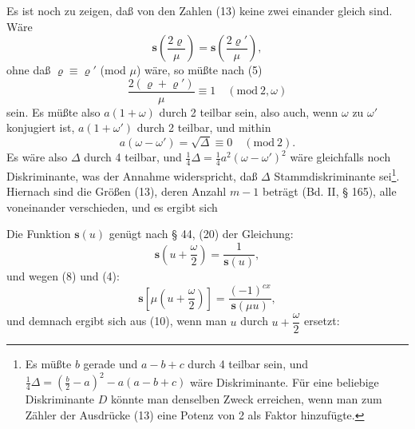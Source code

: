 Es ist noch zu zeigen, daß von den Zahlen (13) keine zwei
einander gleich sind. Wäre
\[
\boldsymbol{s}\left(\frac{2\varrho}{\mu}\right) = \boldsymbol{s}\left(\frac{2\varrho'}{\mu}\right),
\]
ohne daß $\varrho \equiv \varrho'$ (mod $\mu$) wäre, so müßte nach (5)
\[
\frac{2(\varrho + \varrho')}{\mu} \equiv 1 \quad (\mathrm{mod}\ 2, \omega)
\]
sein. Es müßte also $a(1+\omega)$ durch 2 teilbar sein, also auch,
wenn $\omega$ zu $\omega'$ konjugiert ist, $a(1+\omega')$ durch 2 teilbar, und
mithin
\[
a(\omega - \omega') = \sqrt{\Delta} \equiv 0 \quad (\mathrm{mod}\ 2).
\]
Es wäre also $\Delta$ durch 4 teilbar, und $\frac{1}{4}\Delta = \frac{1}{4}a^2(\omega - \omega')^2$
wäre gleichfalls noch Diskriminante, was der Annahme widerspricht,
daß $\Delta$ Stammdiskriminante sei\footnote{Es müßte $b$ gerade und $a-b+c$ durch 4 teilbar sein, und
$\frac{1}{4}\Delta = \left(\frac{b}{2}-a\right)^2 - a(a-b+c)$ wäre Diskriminante. Für eine beliebige
Diskriminante $D$ könnte man denselben Zweck erreichen, wenn man zum
Zähler der Ausdrücke (13) eine Potenz von 2 als Faktor hinzufügte.}. Hiernach sind die
Größen (13), deren Anzahl $m-1$ beträgt (Bd. II, § 165), alle
voneinander verschieden, und es ergibt sich

Die Funktion $\boldsymbol{s}(u)$ genügt nach § 44, (20) der Gleichung:
\[
\boldsymbol{s}\left(u + \frac{\omega}{2}\right) = \frac{1}{\boldsymbol{s}(u)},
\]
und wegen (8) und (4):
\[
\boldsymbol{s}\left[\mu\left(u + \frac{\omega}{2}\right)\right] = \frac{(-1)^{cx}}{\boldsymbol{s}(\mu u)},
\]
und demnach ergibt sich aus (10), wenn man $u$ durch $u + \dfrac{\omega}{2}$
ersetzt:
